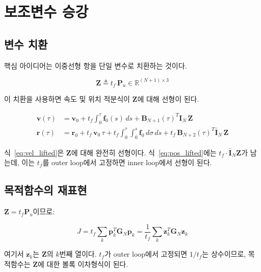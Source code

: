 \documentclass[11pt]{article}
\begin{document}
\section{보조변수 승강}

\subsection{변수 치환}

핵심 아이디어는 이중선형 항을 단일 변수로 치환하는 것이다.

\begin{equation}
  \mathbf{Z} \triangleq t_f\, \mathbf{P}_u \in \mathbb{R}^{(N+1)\times 3}
  \label{eq:lifting}
\end{equation}

이 치환을 사용하면 속도 및 위치 적분식이 $\mathbf{Z}$에 대해 선형이 된다.

\begin{align}
  \mathbf{v}(\tau) &= \mathbf{v}_0
    + t_f \int_0^\tau \mathbf{f}_0(s)\,ds
    + \mathbf{B}_{N+1}(\tau)^T \mathbf{I}_N\, \mathbf{Z} \label{eq:vel_lifted}\\
  \mathbf{r}(\tau) &= \mathbf{r}_0 + t_f\,\mathbf{v}_0\,\tau
    + t_f \int_0^\tau\!\int_0^s \mathbf{f}_0\,d\sigma\,ds
    + t_f\,\mathbf{B}_{N+2}(\tau)^T \bar{\mathbf{I}}_N\, \mathbf{Z} \label{eq:pos_lifted}
\end{align}

식~\eqref{eq:vel_lifted}은 $\mathbf{Z}$에 대해 완전히 선형이다.
식~\eqref{eq:pos_lifted}에는 $t_f \cdot \bar{\mathbf{I}}_N \mathbf{Z}$가 남는데,
이는 $t_f$를 outer loop에서 고정하면 inner loop에서 선형이 된다.

\subsection{목적함수의 재표현}

$\mathbf{Z} = t_f \mathbf{P}_u$이므로:

\begin{equation}
  J = t_f \sum_k \mathbf{p}_k^T \mathbf{G}_N \mathbf{p}_k
  = \frac{1}{t_f} \sum_k \mathbf{z}_k^T \mathbf{G}_N \mathbf{z}_k
  \label{eq:cost_lifted}
\end{equation}

여기서 $\mathbf{z}_k$는 $\mathbf{Z}$의 $k$번째 열이다.
$t_f$가 outer loop에서 고정되면 $1/t_f$는 상수이므로,
목적함수는 $\mathbf{Z}$에 대한 볼록 이차형식이 된다.
\end{document}
